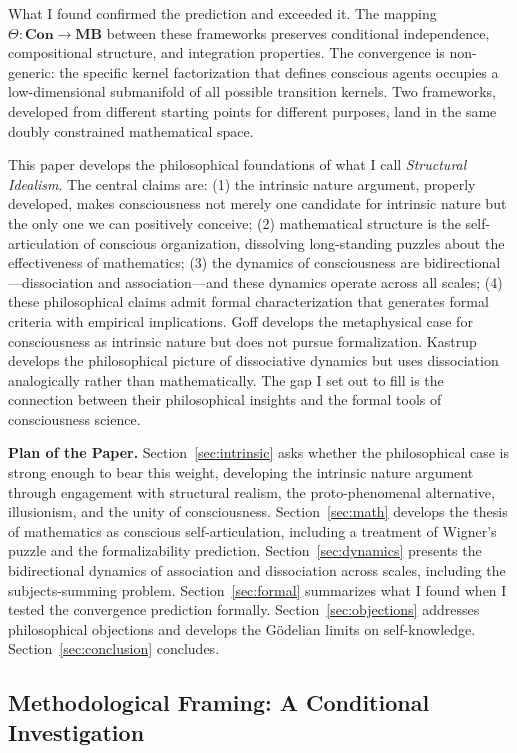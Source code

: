 \documentclass[11pt,a4paper]{article}
\theoremstyle{definition}
\theoremstyle{plain}
\theoremstyle{remark}
\newcommand{\Con}{\mathbf{Con}}
\newcommand{\MB}{\mathbf{MB}}
\begin{document}
What I found confirmed the prediction and exceeded it. The mapping $\Theta: \Con \to \MB$ between these frameworks preserves conditional independence, compositional structure, and integration properties. The convergence is non-generic: the specific kernel factorization that defines conscious agents occupies a low-dimensional submanifold of all possible transition kernels. Two frameworks, developed from different starting points for different purposes, land in the same doubly constrained mathematical space.

This paper develops the philosophical foundations of what I call \textit{Structural Idealism}. The central claims are: (1) the intrinsic nature argument, properly developed, makes consciousness not merely one candidate for intrinsic nature but the only one we can positively conceive; (2) mathematical structure is the self-articulation of conscious organization, dissolving long-standing puzzles about the effectiveness of mathematics; (3) the dynamics of consciousness are bidirectional---dissociation and association---and these dynamics operate across all scales; (4) these philosophical claims admit formal characterization that generates formal criteria with empirical implications. Goff develops the metaphysical case for consciousness as intrinsic nature but does not pursue formalization. Kastrup develops the philosophical picture of dissociative dynamics but uses dissociation analogically rather than mathematically. The gap I set out to fill is the connection between their philosophical insights and the formal tools of consciousness science.

\textbf{Plan of the Paper.} Section~\ref{sec:intrinsic} asks whether the philosophical case is strong enough to bear this weight, developing the intrinsic nature argument through engagement with structural realism, the proto-phenomenal alternative, illusionism, and the unity of consciousness. Section~\ref{sec:math} develops the thesis of mathematics as conscious self-articulation, including a treatment of Wigner's puzzle and the formalizability prediction. Section~\ref{sec:dynamics} presents the bidirectional dynamics of association and dissociation across scales, including the subjects-summing problem. Section~\ref{sec:formal} summarizes what I found when I tested the convergence prediction formally. Section~\ref{sec:objections} addresses philosophical objections and develops the G\"odelian limits on self-knowledge. Section~\ref{sec:conclusion} concludes.

\subsection{Methodological Framing: A Conditional Investigation}\label{sec:method}
\end{document}
